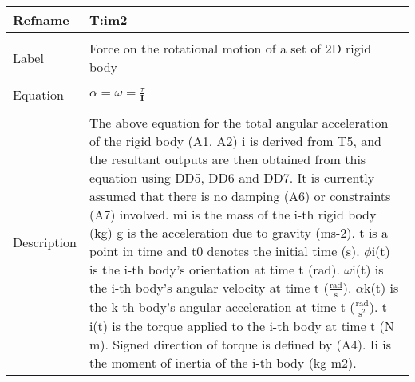 \documentclass[12pt]{article}
\begin{document}
\noindent \begin{minipage}{\textwidth}
\begin{tabular}{p{} p{}}
\toprule \textbf{Refname} & \textbf{T:im2}
\label{T:im2}
\\ \midrule \\
Label & Force on the rotational motion of a set of 2D rigid body
\\ \midrule \\
Equation & $\alpha{}=\omega{}=\frac{\tau{}}{\mathbf{I}}$
\\ \midrule \\
Description & The above equation for the total angular acceleration of the rigid body (A1, A2) i is derived from T5, and the resultant outputs are then obtained from this equation using DD5, DD6 and DD7. It is currently assumed that there is no damping (A6) or constraints (A7) involved. mi is the mass of the i-th rigid body (kg) g is the acceleration due to gravity (ms-2). t is a point in time and t0 denotes the initial time (s). $\phi{}$i(t) is the i-th body's orientation at time t (rad). $\omega{}$i(t) is the i-th body's angular velocity at time t ($\frac{\text{rad}}{\text{s}}$). $\alpha{}$k(t) is the k-th body's angular acceleration at time t ($\frac{\text{rad}}{\text{s}^{2}}$). t i(t) is the torque applied to the i-th body at time t (N m). Signed direction of torque is defined by (A4). Ii is the moment of inertia of the i-th body (kg m2).
\\ \bottomrule \end{tabular}
\end{minipage}\\
~\newline
\end{document}
